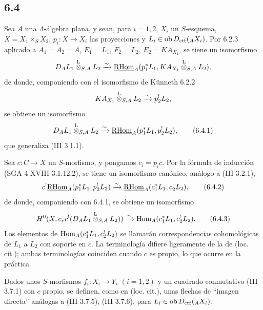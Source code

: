 \subsection*{6.4}
Sea $A$ una $\Lambda$-álgebra plana, y sean, para $i=1,2$, $X_i$ un $S$-esquema, $X=X_1\times_SX_2$, $p_i:X\to X_i$ las proyecciones y $L_i\in\operatorname{ob} D_{\mathrm{ctf}}({}_AX_i)$. Por 6.2.3 aplicado a $A_1=A_2=A$, $E_1=L_1$, $F_2=L_2$, $E_2=KA_{X_1}$, se tiene un isomorfismo
\[
D_A L_1\overset{\mathrm L}{\otimes}_{S,A}L_2
\xrightarrow{\sim}
\underline{\mathrm{RHom}}_A(p_1^*L_1,KA_{X_1}\overset{\mathrm L}{\otimes}_{S,A}L_2),
\]
de donde, componiendo con el isomorfismo de Künneth 6.2.2
\[
KA_{X_1}\overset{\mathrm L}{\otimes}_{S,A}L_2\xrightarrow{\sim}p_2^!L_2,
\]
se obtiene un isomorfismo
\begin{equation}
D_AL_1\overset{\mathrm L}{\otimes}_{S,A}L_2
\xrightarrow{\sim}
\underline{\mathrm{RHom}}_A(p_1^*L_1,p_2^!L_2),
\tag{6.4.1}
\end{equation}
que generaliza (III 3.1.1).

Sea $c:C\to X$ un $S$-morfismo, y pongamos $c_i=p_ic$. Por la fórmula de inducción (SGA 4 XVIII 3.1.12.2), se tiene un isomorfismo canónico, análogo a (III 3.2.1),
\begin{equation}
c^!\underline{\mathrm{RHom}}_A(p_1^*L_1,p_2^!L_2)
\xrightarrow{\sim}
\underline{\mathrm{RHom}}_A(c_1^*L_1,c_2^!L_2),
\tag{6.4.2}
\end{equation}
de donde, componiendo con 6.4.1, se obtiene un isomorfismo
\begin{equation}
H^0(X,c_*c^!(D_AL_1\overset{\mathrm L}{\otimes}_{S,A}L_2))
\xrightarrow{\sim}
\operatorname{Hom}_A(c_1^*L_1,c_2^!L_2).
\tag{6.4.3}
\end{equation}
Los elementos de $\operatorname{Hom}_A(c_1^*L_1,c_2^!L_2)$ se llamarán correspondencias cohomológicas de $L_1$ a $L_2$ con soporte en $c$. La terminología difiere ligeramente de la de (loc. cit.); ambas terminologías coinciden cuando $c$ es propio, lo que ocurre en la práctica.

Dados unos $S$-morfismos $f_i:X_i\to Y_i$ $(i=1,2)$ y un cuadrado conmutativo (III 3.7.1) con $c$ propio, se definen, como en (loc. cit.), unas flechas de ``imagen directa'' análogas a (III 3.7.5), (III 3.7.6), para $L_i\in\operatorname{ob} D_{\mathrm{ctf}}({}_AX_i)$.
